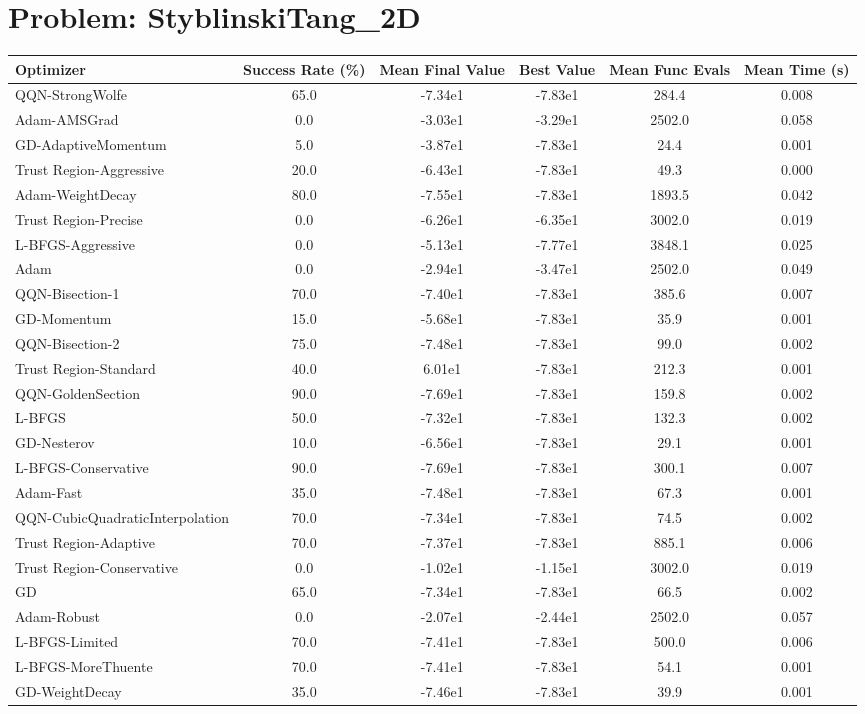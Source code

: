 \documentclass{article}
\begin{document}
\section{Problem: StyblinskiTang\_2D}
\begin{longtable}{p{3cm}*{5}{c}}
\toprule
\textbf{Optimizer} & \textbf{Success Rate (\%)} & \textbf{Mean Final Value} & \textbf{Best Value} & \textbf{Mean Func Evals} & \textbf{Mean Time (s)} \\
\midrule
QQN-StrongWolfe & 65.0 & -7.34e1 & -7.83e1 & 284.4 & 0.008 \\
Adam-AMSGrad & 0.0 & -3.03e1 & -3.29e1 & 2502.0 & 0.058 \\
GD-AdaptiveMomentum & 5.0 & -3.87e1 & -7.83e1 & 24.4 & 0.001 \\
Trust Region-Aggressive & 20.0 & -6.43e1 & -7.83e1 & 49.3 & 0.000 \\
Adam-WeightDecay & 80.0 & -7.55e1 & -7.83e1 & 1893.5 & 0.042 \\
Trust Region-Precise & 0.0 & -6.26e1 & -6.35e1 & 3002.0 & 0.019 \\
L-BFGS-Aggressive & 0.0 & -5.13e1 & -7.77e1 & 3848.1 & 0.025 \\
Adam & 0.0 & -2.94e1 & -3.47e1 & 2502.0 & 0.049 \\
QQN-Bisection-1 & 70.0 & -7.40e1 & -7.83e1 & 385.6 & 0.007 \\
GD-Momentum & 15.0 & -5.68e1 & -7.83e1 & 35.9 & 0.001 \\
QQN-Bisection-2 & 75.0 & -7.48e1 & -7.83e1 & 99.0 & 0.002 \\
Trust Region-Standard & 40.0 & 6.01e1 & -7.83e1 & 212.3 & 0.001 \\
QQN-GoldenSection & 90.0 & -7.69e1 & -7.83e1 & 159.8 & 0.002 \\
L-BFGS & 50.0 & -7.32e1 & -7.83e1 & 132.3 & 0.002 \\
GD-Nesterov & 10.0 & -6.56e1 & -7.83e1 & 29.1 & 0.001 \\
L-BFGS-Conservative & 90.0 & -7.69e1 & -7.83e1 & 300.1 & 0.007 \\
Adam-Fast & 35.0 & -7.48e1 & -7.83e1 & 67.3 & 0.001 \\
QQN-CubicQuadraticInterpolation & 70.0 & -7.34e1 & -7.83e1 & 74.5 & 0.002 \\
Trust Region-Adaptive & 70.0 & -7.37e1 & -7.83e1 & 885.1 & 0.006 \\
Trust Region-Conservative & 0.0 & -1.02e1 & -1.15e1 & 3002.0 & 0.019 \\
GD & 65.0 & -7.34e1 & -7.83e1 & 66.5 & 0.002 \\
Adam-Robust & 0.0 & -2.07e1 & -2.44e1 & 2502.0 & 0.057 \\
L-BFGS-Limited & 70.0 & -7.41e1 & -7.83e1 & 500.0 & 0.006 \\
L-BFGS-MoreThuente & 70.0 & -7.41e1 & -7.83e1 & 54.1 & 0.001 \\
GD-WeightDecay & 35.0 & -7.46e1 & -7.83e1 & 39.9 & 0.001 \\
\bottomrule
\end{longtable}
\end{document}
